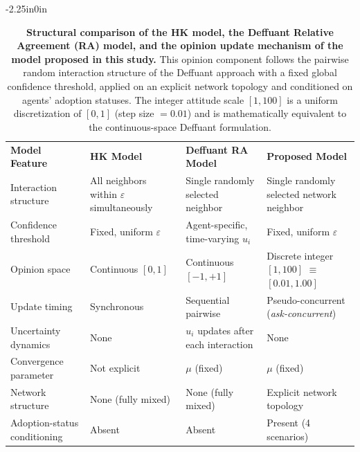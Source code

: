 \documentclass[10pt,letterpaper]{article}
\newlength\savedwidth
\newcommand\thickhline{\noalign{\global\savedwidth\arrayrulewidth\global\arrayrulewidth 2pt}%
\hline
\noalign{\global\arrayrulewidth\savedwidth}}
\begin{document}
\begin{table}[!ht]
\caption{\textbf{Structural comparison of the HK model, the Deffuant Relative Agreement (RA) model, and the opinion update mechanism of the model proposed in this study.}
This opinion component follows the pairwise random interaction structure of the Deffuant approach with a fixed global confidence threshold, applied on an explicit network topology and conditioned on agents' adoption statuses. The integer attitude scale $[1, 100]$ is a uniform discretization of $[0, 1]$ (step size $= 0.01$) and is mathematically equivalent to the continuous-space Deffuant formulation.}
\label{table1}
\begin{adjustwidth}{-2.25in}{0in}
\centering
\small
\begin{tabularx}{\linewidth}{|>{\centering\arraybackslash}m{3.0cm}|X|X|X|}
\hline
\textbf{Model Feature} & \textbf{HK Model} & \textbf{Deffuant RA Model} & \textbf{Proposed Model} \\ \thickhline
Interaction structure & All neighbors within $\varepsilon$ simultaneously & Single randomly selected neighbor & Single randomly selected network neighbor \\ \hline
Confidence threshold & Fixed, uniform $\varepsilon$ & Agent-specific, time-varying $u_i$ & Fixed, uniform $\varepsilon$ \\ \hline
Opinion space & Continuous $[0, 1]$ & Continuous $[-1, +1]$ & Discrete integer $[1, 100]$ $\equiv$ $[0.01, 1.00]$ \\ \hline
Update timing & Synchronous & Sequential pairwise & Pseudo-concurrent (\textit{ask-concurrent}) \\ \hline
Uncertainty dynamics & None & $u_i$ updates after each interaction & None \\ \hline
Convergence parameter & Not explicit & $\mu$ (fixed) & $\mu$ (fixed) \\ \hline
Network structure & None (fully mixed) & None (fully mixed) & Explicit network topology \\ \hline
Adoption-status conditioning & Absent & Absent & Present (4 scenarios) \\ \hline
\end{tabularx}
\end{adjustwidth}
\end{table}
\end{document}
